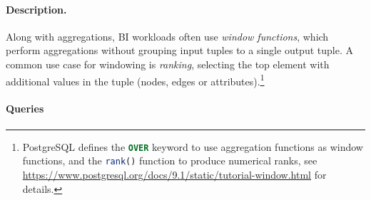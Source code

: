 
\paragraph{Description.}

Along with aggregations, BI workloads often use \emph{window functions}, which
perform aggregations without grouping input tuples to a single output tuple.  A
common use case for windowing is \emph{ranking}, \ie selecting the top element
with additional values in the tuple (nodes, edges or
attributes).\footnote{PostgreSQL defines the \lstinline[language=sql]{OVER}
keyword to use aggregation functions as window functions, and the
\lstinline[language=sql]{rank()} function to produce numerical ranks, see
\url{https://www.postgresql.org/docs/9.1/static/tutorial-window.html} for
details.}


\paragraph{Queries}
{\raggedright
}